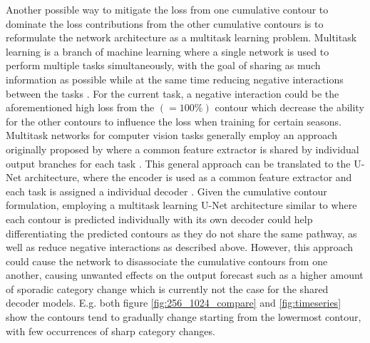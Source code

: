 \documentclass[../main/thesis]{subfiles}
\begin{document}
Another possible way to mitigate the loss from one cumulative contour to dominate the loss contributions from the other cumulative contours is to reformulate the network architecture as a multitask learning problem. Multitask learning is a branch of machine learning where a single network is used to perform multiple tasks simultaneously, with the goal of sharing as much information as possible while at the same time reducing negative interactions between the tasks \citep{Crawshaw2020}. For the current task, a negative interaction could be the aforementioned high loss from the $(=100\%)$ contour which decrease the ability for the other contours to influence the loss when training for certain seasons. Multitask networks for computer vision tasks generally employ an approach originally proposed by \citet{Zhang2014} where a common feature extractor is shared by individual output branches for each task \citep{Crawshaw2020}. This general approach can be translated to the U-Net architecture, where the encoder is used as a common feature extractor and each task is assigned a individual decoder \citep{Jha2020}. Given the cumulative contour formulation, employing a multitask learning U-Net architecture similar to \citet{Jha2020} where each contour is predicted individually with its own decoder could help differentiating the predicted contours as they do not share the same pathway, as well as reduce negative interactions as described above. However, this approach could cause the network to disassociate the cumulative contours from one another, causing unwanted effects on the output forecast such as a higher amount of sporadic category change which is currently not the case for the shared decoder models. E.g. both figure \ref{fig:256_1024_compare} and \ref{fig:timeseries} show the contours tend to gradually change starting from the lowermost contour, with few occurrences of sharp category changes.
\end{document}
